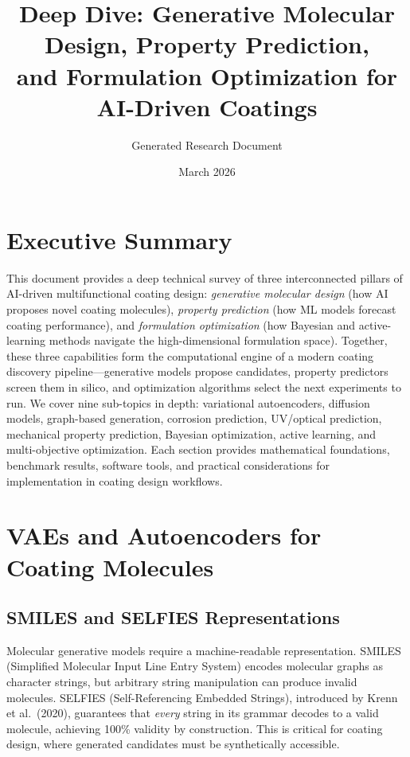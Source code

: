 \documentclass[11pt,a4paper]{article}
\title{\textbf{Deep Dive: Generative Molecular Design, Property Prediction,\\and Formulation Optimization for AI-Driven Coatings}}
\author{Generated Research Document}
\date{March 2026}
\begin{document}
\maketitle
\tableofcontents
\newpage

\section{Executive Summary}

This document provides a deep technical survey of three interconnected pillars of AI-driven multifunctional coating design: \emph{generative molecular design} (how AI proposes novel coating molecules), \emph{property prediction} (how ML models forecast coating performance), and \emph{formulation optimization} (how Bayesian and active-learning methods navigate the high-dimensional formulation space).
Together, these three capabilities form the computational engine of a modern coating discovery pipeline---generative models propose candidates, property predictors screen them in silico, and optimization algorithms select the next experiments to run.
We cover nine sub-topics in depth: variational autoencoders, diffusion models, graph-based generation, corrosion prediction, UV/optical prediction, mechanical property prediction, Bayesian optimization, active learning, and multi-objective optimization.
Each section provides mathematical foundations, benchmark results, software tools, and practical considerations for implementation in coating design workflows.

\section{VAEs and Autoencoders for Coating Molecules}
\label{sec:vaes}

\subsection{SMILES and SELFIES Representations}

Molecular generative models require a machine-readable representation.
SMILES (Simplified Molecular Input Line Entry System) encodes molecular graphs as character strings, but arbitrary string manipulation can produce invalid molecules.
SELFIES (Self-Referencing Embedded Strings), introduced by Krenn et al.\ (2020), guarantees that \emph{every} string in its grammar decodes to a valid molecule, achieving 100\% validity by construction.
This is critical for coating design, where generated candidates must be synthetically accessible.
\end{document}

